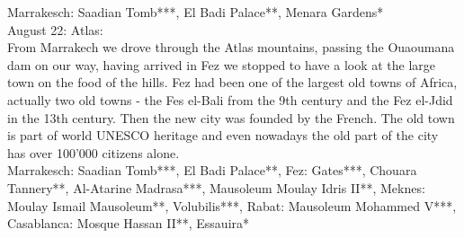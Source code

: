 Marrakesch: Saadian Tomb***, El Badi Palace**, Menara Gardens*\\

August 22: Atlas:\\
From Marrakech we drove through the Atlas mountains, passing the Ouaoumana dam on our way, having arrived in Fez we stopped to have a look at the large town on the food of the hills. Fez had been one of the largest old towns of Africa, actually two old towns - the Fes el-Bali from the 9th century and the Fez el-Jdid in the 13th century. Then the new city was founded by the French. The old town is part of world UNESCO heritage and even nowadays the old part of the city has over 100'000 citizens alone. \\

Marrakesch: Saadian Tomb***, El Badi Palace**, Fez: Gates***, Chouara Tannery**, Al-Atarine Madrasa***, Mausoleum Moulay Idris II**, Meknes: Moulay Ismail Mausoleum**, Volubilis***, Rabat: Mausoleum Mohammed V***, Casablanca: Mosque Hassan II**, Essauira*
